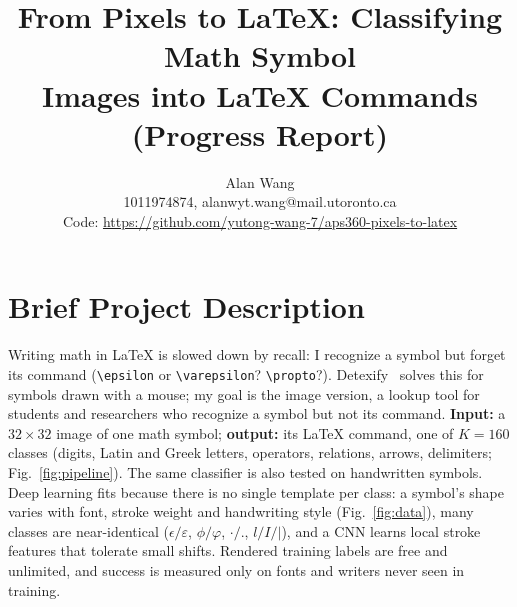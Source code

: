 \documentclass[final]{article}
\title{From Pixels to \LaTeX: Classifying Math Symbol\\Images into \LaTeX{} Commands {\large(Progress Report)}}
\author{%
  Alan Wang \\
  1011974874, alanwyt.wang@mail.utoronto.ca\\
  Code: \url{https://github.com/yutong-wang-7/aps360-pixels-to-latex}\\
}
\newcommand{\cmd}[1]{\texttt{\textbackslash #1}}
\begin{document}
\maketitle

\vspace{-0.45in}

\section{Brief Project Description}
\vspace{-0.05in}

Writing math in \LaTeX{} is slowed down by recall: I recognize a symbol but forget its command
(\cmd{epsilon} or \cmd{varepsilon}? \cmd{propto}?). Detexify~\cite{detexify} solves this for symbols
drawn with a mouse; my goal is the image version, a lookup tool for students and researchers who
recognize a symbol but not its command. \textbf{Input:} a $32{\times}32$ image of one math symbol;
\textbf{output:} its \LaTeX{} command, one of $K=160$ classes (digits, Latin and Greek letters, operators,
relations, arrows, delimiters; Fig.~\ref{fig:pipeline}). The same classifier is also tested on handwritten
symbols. Deep learning fits because there is no single template per class: a symbol's shape varies with
font, stroke weight and handwriting style (Fig.~\ref{fig:data}), many classes are near-identical
($\epsilon/\varepsilon$, $\phi/\varphi$, ${\cdot}/.$, $l/I/|$), and a CNN learns local stroke features
that tolerate small shifts. Rendered training labels are free and unlimited, and success is measured only
on fonts and writers never seen in training.
\end{document}
